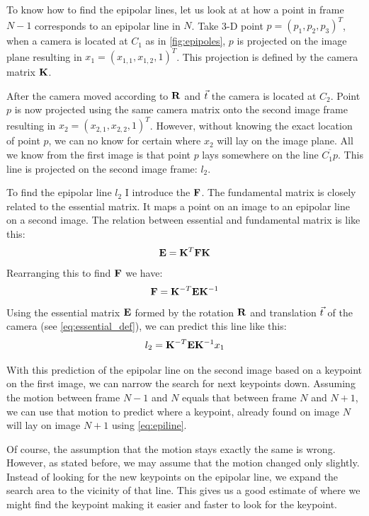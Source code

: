 To know how to find the epipolar lines, let us look at at how a point in frame $N-1$ corresponds to an epipolar line in $N$. Take 3-D point $p=(p_1, p_2, p_3)^T$, when a camera is located at $C_1$ as in \autoref{fig:epipoles}, $p$ is projected on the image plane resulting in $x_1=(x_{1, 1}, x_{1, 2}, 1)^T$. This projection is defined by the camera matrix $\mathbf{K}$. \bigskip 

After the camera moved according to $\mathbf{R}$ and $\vec t$ the camera is located at $C_2$. Point $p$ is now projected using the same camera matrix onto the second image frame resulting in $x_2=(x_{2, 1}, x_{2, 2}, 1)^T$. However, without knowing the exact location of point $p$, we can no know for certain where $x_2$ will lay on the image plane. All we know from the first image is that point $p$ lays somewhere on the line $\overline{C_1p}$. This line is projected on the second image frame: $l_2$.\bigskip

To find the epipolar line $l_2$ I introduce the  $\mathbf{F}$. The fundamental matrix is closely related to the essential matrix. It maps a point on an image to an epipolar line on a second image. The relation between essential and fundamental matrix is like this:
\begin{equation}
    \mathbf{E} = \mathbf{K}^T\mathbf{F}\mathbf{K}
\end{equation}
Rearranging this to find $\mathbf{F}$ we have:
\begin{equation}
    \mathbf{F} = \mathbf{K}^{-T}\mathbf{E}\mathbf{K}^{-1}
\end{equation}
Using the essential matrix $\mathbf{E}$ formed by the rotation $\mathbf{R}$ and translation $\vec t$ of the camera (see \autoref{eq:essential_def}), we can predict this line like this:
\begin{equation}\label{eq:epiline}
    l_2 = \mathbf{K}^{-T}\mathbf{E}\mathbf{K}^{-1}x_1
\end{equation}

With this prediction of the epipolar line on the second image based on a keypoint on the first image, we can narrow the search for next keypoints down. Assuming the motion between frame $N-1$ and $N$ equals that between frame $N$ and $N+1$, we can use that motion to predict where a keypoint, already found on image $N$ will lay on image $N+1$ using \autoref{eq:epiline}.\bigskip

Of course, the assumption that the motion stays exactly the same is wrong. However, as stated before, we may assume that the motion changed only slightly. Instead of looking for the new keypoints on the epipolar line, we expand the search area to the vicinity of that line. This gives us a good estimate of where we might find the keypoint making it easier and faster to look for the keypoint.\bigskip

